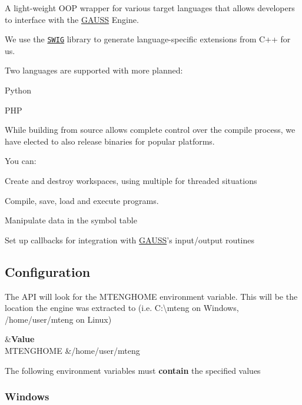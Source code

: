 A light-\/weight O\-O\-P wrapper for various target languages that allows developers to interface with the \hyperlink{class_g_a_u_s_s}{G\-A\-U\-S\-S} Engine.

We use the \href{http://www.swig.org}{\tt S\-W\-I\-G} library to generate language-\/specific extensions from C++ for us.

Two languages are supported with more planned\-:


\begin{DoxyItemize}
\item Python
\item P\-H\-P
\end{DoxyItemize}

While building from source allows complete control over the compile process, we have elected to also release binaries for popular platforms.

You can\-:
\begin{DoxyItemize}
\item Create and destroy workspaces, using multiple for threaded situations
\item Compile, save, load and execute programs.
\item Manipulate data in the symbol table
\item Set up callbacks for integration with \hyperlink{class_g_a_u_s_s}{G\-A\-U\-S\-S}'s input/output routines
\end{DoxyItemize}

\subsection*{Configuration}

The A\-P\-I will look for the {\ttfamily M\-T\-E\-N\-G\-H\-O\-M\-E} environment variable. This will be the location the engine was extracted to (i.\-e. {\ttfamily C\-:\textbackslash{}mteng} on Windows, {\ttfamily /home/user/mteng} on Linux)

\begin{TabularC}{2}
\hline
{}&{\bf Value}\\
{\ttfamily M\-T\-E\-N\-G\-H\-O\-M\-E} &{\ttfamily /home/user/mteng} \\
\end{TabularC}


The following environment variables must {\bfseries contain} the specified values

\subsubsection*{Windows}

